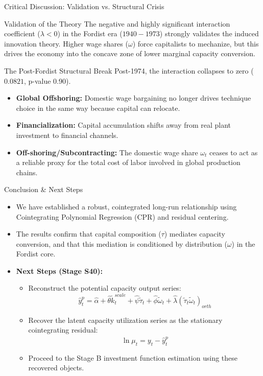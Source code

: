 \documentclass[10pt]{beamer}
\begin{document}
\begin{frame}{Critical Discussion: Validation vs. Structural Crisis}
  \begin{block}{Validation of the Theory}
    The negative and highly significant interaction coefficient ($\lambda < 0$) in the Fordist era ($1940-1973$) strongly validates the induced innovation theory. Higher wage shares ($\omega$) force capitalists to mechanize, but this drives the economy into the concave zone of lower marginal capacity conversion.
  \end{block}
  \begin{block}{The Post-Fordist Structural Break}
    Post-1974, the interaction collapses to zero ($0.0821$, p-value 0.90).
    \begin{itemize}
      \item \textbf{Global Offshoring:} Domestic wage bargaining no longer drives technique choice in the same way because capital can relocate.
      \item \textbf{Financialization:} Capital accumulation shifts away from real plant investment to financial channels.
      \item \textbf{Off-shoring/Subcontracting:} The domestic wage share $\omega_t$ ceases to act as a reliable proxy for the total cost of labor involved in global production chains.
    \end{itemize}
  \end{block}
\end{frame}

\begin{frame}{Conclusion \& Next Steps}
  \begin{itemize}
    \item We have established a robust, cointegrated long-run relationship using Cointegrating Polynomial Regression (CPR) and residual centering.
    \item The results confirm that capital composition ($\tau$) mediates capacity conversion, and that this mediation is conditioned by distribution ($\omega$) in the Fordist core.
    \item \textbf{Next Steps (Stage S40):}
      \begin{itemize}
        \item Reconstruct the potential capacity output series:
          $$\hat{y}_t^p = \hat{\alpha} + \hat{\theta} \tilde{k}^{scale}_t + \hat{\psi} \tilde{\tau}_t + \hat{\phi} \tilde{\omega}_t + \hat{\lambda} (\tilde{\tau}_t \tilde{\omega}_t)_{orth}$$
        \item Recover the latent capacity utilization series as the stationary cointegrating residual:
          $$\widehat{\ln \mu_t} = y_t - \hat{y}_t^p$$
        \item Proceed to the Stage B investment function estimation using these recovered objects.
      \end{itemize}
  \end{itemize}
\end{frame}
\end{document}
